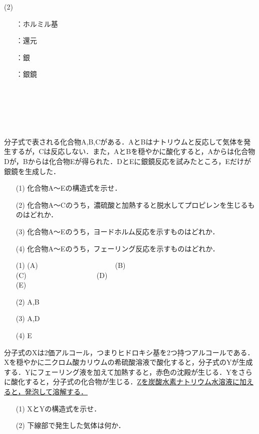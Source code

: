 \documentclass[a4paper,12pt]{ltjsreport}
\begin{document}
\begin{minipage}{0.5\linewidth}
\noindent (2)
\begin{itemize}
    \item[\fbox{ク}]：ホルミル基\\
      \item [\fbox{ケ}]：還元\\
  \item [\fbox{コ}]：銀\\
  \item [\fbox{サ}]：銀鏡\\
    \item [　]　\\
  \item [　]　\\
  \item [　]　
\end{itemize}
\end{minipage}
\newpage
\begin{que}
分子式で表される化合物A,B,Cがある．AとBはナトリウムと反応して気体を発生するが，Cは反応しない．また，AとBを穏やかに酸化すると，Aからは化合物Dが，Bからは化合物Eが得られた．DとEに銀鏡反応を試みたところ，Eだけが銀鏡を生成した．
\begin{itemize}
    \item [(1)]化合物A〜Eの構造式を示せ．
    \item [(2)]化合物A〜Cのうち，濃硫酸と加熱すると脱水してプロピレンを生じるものはどれか．
    \item [(3)]化合物A〜Eのうち，ヨードホルム反応を示すものはどれか．
    \item [(4)]化合物A〜Eのうち，フェーリング反応を示すものはどれか．
\end{itemize}
\end{que}
\ans 
\begin{itemize}
    \item[(1)](A)　　　　　　　　　　　(B)\\[70pt]
         (C)　　　　　　　　　　(D)\\[70pt]
            (E)\\
    \item[(2)]A,B\\[10pt]
    \item[(3)]A,D　\\[10pt]
    \item[(4)]E
\end{itemize}
\begin{que}
分子式のXは2価アルコール，つまりヒドロキシ基を2つ持つアルコールである．Xを穏やかに二クロム酸カリウムの希硫酸溶液で酸化すると，分子式のYが生成する．Yにフェーリング液を加えて加熱すると，赤色の沈殿が生じる．Yをさらに酸化すると，分子式の化合物が生じる．\underline{Zを炭酸水素ナトリウム水溶液に加えると，発泡して溶解する．}
\begin{itemize}
    \item [(1)]XとYの構造式を示せ．
    \item [(2)]下線部で発生した気体は何か．
\end{itemize}
\end{que}
\end{document}
